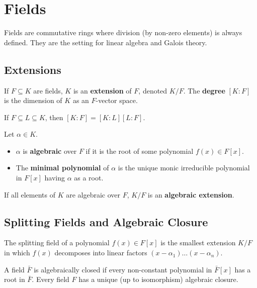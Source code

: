 \section{Fields}

Fields are commutative rings where division (by non-zero elements) is always defined. They are the setting for linear algebra and Galois theory.

\subsection{Extensions}

\begin{definition}
If $F \subseteq K$ are fields, $K$ is an \textbf{extension} of $F$, denoted $K/F$. The \textbf{degree} $[K:F]$ is the dimension of $K$ as an $F$-vector space.
\end{definition}

\begin{theorem}
If $F \subseteq L \subseteq K$, then $[K:F] = [K:L][L:F]$.
\end{theorem}

\begin{definition}
Let $\alpha \in K$.
\begin{itemize}
    \item $\alpha$ is \textbf{algebraic} over $F$ if it is the root of some polynomial $f(x) \in F[x]$.
    \item The \textbf{minimal polynomial} of $\alpha$ is the unique monic irreducible polynomial in $F[x]$ having $\alpha$ as a root.
\end{itemize}
If all elements of $K$ are algebraic over $F$, $K/F$ is an \textbf{algebraic extension}.
\end{definition}

\subsection{Splitting Fields and Algebraic Closure}

\begin{definition}
The splitting field of a polynomial $f(x) \in F[x]$ is the smallest extension $K/F$ in which $f(x)$ decomposes into linear factors $(x-\alpha_1)\dots(x-\alpha_n)$.
\end{definition}

\begin{definition}
A field $\bar{F}$ is algebraically closed if every non-constant polynomial in $\bar{F}[x]$ has a root in $\bar{F}$. Every field $F$ has a unique (up to isomorphism) algebraic closure.
\end{definition}

